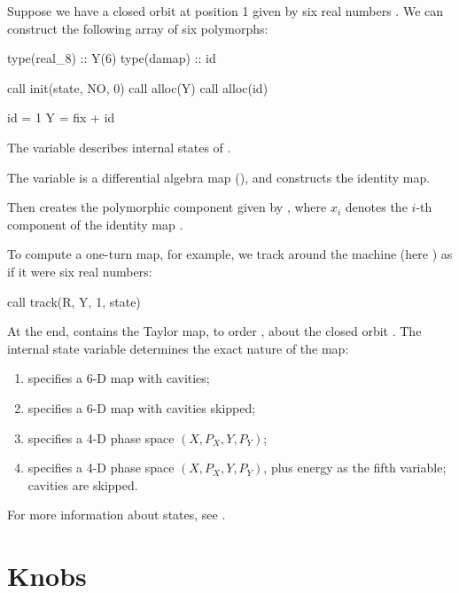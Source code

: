 %
Suppose we have a closed orbit at position 1 given by six real numbers . We can construct the following array of six polymorphs:

\begin{ptccode}
type(real_8) :: Y(6)
type(damap) :: id

call init(state, NO, 0)
call alloc(Y)
call alloc(id)

id = 1
Y = fix + id
\end{ptccode}

The variable  describes internal states of \PTC.

The variable  is a differential algebra map (), and  constructs the identity map.

Then  creates the polymorphic component  given by , where $x_i$ denotes the $i$-th component of the identity map .

%
To compute a one-turn map, for example, we track  around the
machine (here ) as if it were six real numbers:

\begin{ptccode}
call track(R, Y, 1, state)
\end{ptccode}

%
At the end,  contains the Taylor map, to order , about the closed orbit . The internal state variable  determines the exact nature of the map:
\begin{enumerate}
  \item {} specifies a 6-D map with cavities;
  \item {} specifies a 6-D map with cavities skipped;
  \item {} specifies a 4-D phase space $(X, P_X, Y, P_Y)$;
  \item {} specifies a 4-D phase
space $(X, P_X, Y, P_Y)$, plus energy as the fifth variable; cavities are skipped.
\end{enumerate}

For more information about states, see .


\section{Knobs}

